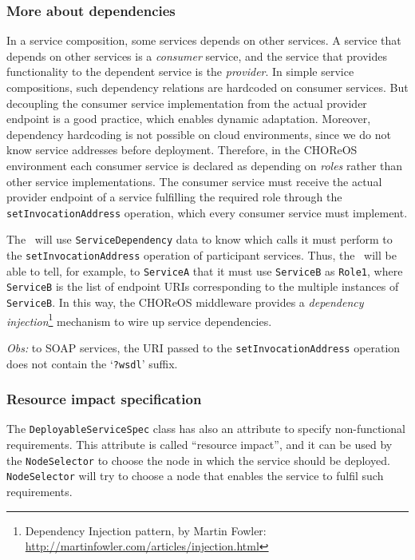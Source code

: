 \subsubsection*{More about dependencies}

In a service composition, some services depends on other services. A service that depends on other services is a \emph{consumer} service, and the service that provides functionality to the dependent service is the \emph{provider}. In simple service compositions, such dependency relations are hardcoded on consumer services. But decoupling the consumer service implementation from the actual provider endpoint is a good practice, which enables dynamic adaptation. Moreover, dependency hardcoding is not possible on cloud environments, since we do not know service addresses before deployment. Therefore, in the CHOReOS environment each consumer service is declared as depending on \emph{roles} rather than other service implementations. The consumer service must receive the actual provider endpoint of a service fulfilling the required role through the \verb!setInvocationAddress! operation, which every consumer service must implement.  

The \ee\ will use \verb!ServiceDependency! data to know which calls it must perform to the  \verb!setInvocationAddress! operation of participant services. Thus, the \ee\ will be able to tell, for example, to \verb!ServiceA! that it must use \verb!ServiceB! as \verb!Role1!, where \verb!ServiceB! is the list of endpoint URIs corresponding to the multiple instances of \verb!ServiceB!. In this way, the CHOReOS middleware provides a \emph{dependency injection}\footnote{Dependency Injection pattern, by Martin Fowler: \url{http://martinfowler.com/articles/injection.html}} mechanism to wire up service dependencies.

\emph{Obs:} to SOAP services, the URI passed to the \texttt{setInvocationAddress} operation does not contain the `\texttt{?wsdl}' suffix.

\subsubsection*{Resource impact specification}

The \verb!DeployableServiceSpec! class has also an attribute to specify non-functional requirements. This attribute is called ``resource impact'', and it can be used by the \verb!NodeSelector! to choose the node in which the service should be deployed. \verb!NodeSelector! will try to choose a node that enables the service to fulfil such requirements.

